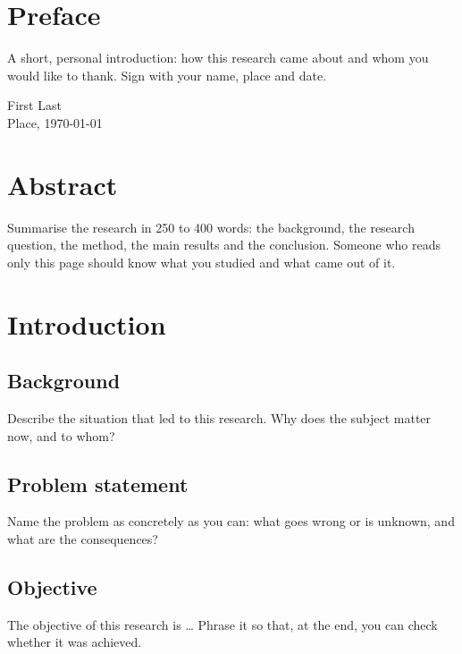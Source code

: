 \documentclass[11pt, a4paper, oneside]{report}
\begin{document}
\maketitlepage


\chapter*{Preface}
A short, personal introduction: how this research came about and whom you
would like to thank. Sign with your name, place and date.

\bigskip
\noindent First Last\\
Place, \today

\chapter*{Abstract}
Summarise the research in 250 to 400 words: the background, the research
question, the method, the main results and the conclusion. Someone who
reads only this page should know what you studied and what came out of
it.


\tableofcontents

\clearpage
{}

\chapter{Introduction}
\label{ch:introduction}

\section{Background}
Describe the situation that led to this research. Why does the subject
matter now, and to whom?

\section{Problem statement}
Name the problem as concretely as you can: what goes wrong or is
unknown, and what are the consequences?

\section{Objective}
The objective of this research is \ldots{} Phrase it so that, at the end,
you can check whether it was achieved.
\end{document}
